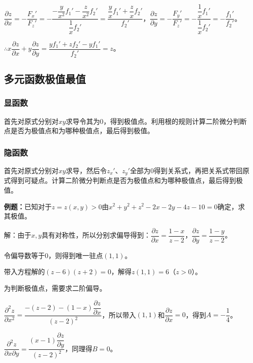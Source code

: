 $\dfrac{\partial z}{\partial x}=-\dfrac{F_x'}{F_z'}=-\dfrac{-\dfrac{y}{x^2}f_1'-\dfrac{z}{x^2}f_2'}{\dfrac{1}{x}f_2'}=\dfrac{\dfrac{y}{x}f_1'+\dfrac{z}{x}f_2'}{f_2'}$，$\dfrac{\partial z}{\partial y}=-\dfrac{F_y'}{F_z'}=-\dfrac{\dfrac{1}{x}f_1'}{\dfrac{1}{x}f_2'}=-\dfrac{f_1'}{f_2'}$。

$\therefore x\dfrac{\partial z}{\partial x}+y\dfrac{\partial z}{\partial y}=\dfrac{yf_1'+zf_2'-yf_1'}{f_2'}=z$。

\subsection{多元函数极值最值}

\paragraph{}

\subsubsection{显函数}

首先对原式分别对$xy$求导令其为0，得到极值点。利用根的规则计算二阶微分判断点是否为极值点和为哪种极值点，最后得到极值。

\subsubsection{隐函数}

首先对原式分别对$xy$求导，然后令$z_x'$、$z_y'$全部为0得到关系式，再把关系式带回原式得到可疑点。计算二阶微分判断点是否为极值点和为哪种极值点，最后得到极值。

\textbf{例题：}已知对于$z=z(x,y)>0$由$x^2+y^2+z^2-2x-2y-4z-10=0$确定，求其极值。

解：由于$x,y$具有对称性，所以分别求偏导得到：$\dfrac{\partial z}{\partial x}=\dfrac{1-x}{z-2}$，$\dfrac{\partial z}{\partial y}=\dfrac{1-y}{z-2}$。

令偏导数等于0，则得到唯一驻点$(1,1)$。

带入方程解的$(z-6)(z+2)=0$，解得$z(1,1)=6$（$z>0$）。

为判断极值点，需要求二阶偏导。

$\dfrac{\partial^2z}{\partial x^2}=\dfrac{-(z-2)-(1-x)\dfrac{\partial z}{\partial x}}{(z-2)^2}$，所以带入$(1,1)$和$\dfrac{\partial z}{\partial x}=0$，得到$A=-\dfrac{1}{4}$。

$\dfrac{\partial^2z}{\partial x\partial y}=\dfrac{(x-1)\dfrac{\partial z}{\partial y}}{(z-2)^2}$，同理得$B=0$。

